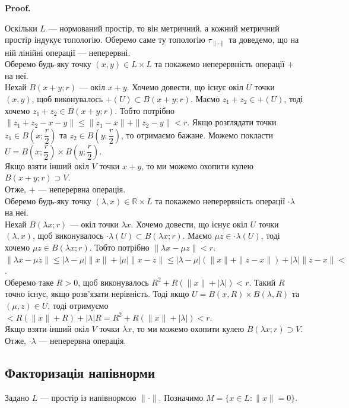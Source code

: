 \documentclass[a4paper, 10pt]{article}
\makeatletter
\theoremstyle{theoremdd}
\theoremstyle{theoremdd}
\theoremstyle{theoremdd}
\theoremstyle{theoremdd}
\theoremstyle{theoremdd}
\theoremstyle{theoremdd}
\theoremstyle{theoremdd}
\theoremstyle{theoremdd}
\renewenvironment{proof}[1][Proof.\\]{\par
\pushQED{\hfill \qed}%
\normalfont \topsep6\p@\@plus6\p@\relax
\trivlist
\item\relax
{\bfseries
#1\@addpunct{.}}\hspace\labelsep\ignorespaces
}{%
\popQED\endtrivlist\@endpefalse
}
\makeatother
\begin{document}
\begin{proof}
Оскільки $L$ --- нормований простір, то він метричний, а кожний метричний простір індукує топологію. Оберемо саме ту топологію $\tau_{\| \cdot \|}$ та доведемо, що на ній лінійні операції --- неперервні.\\
Оберемо будь-яку точку $(x,y) \in L \times L$ та покажемо неперервність операції $+$ на неї.\\
Нехай $B(x+y;r)$ --- окіл $x+y$. Хочемо довести, що існує окіл $U$ точки $(x,y)$, щоб виконувалось $+(U) \subset B(x+y;r)$. Маємо $z_1+z_2 \in +(U)$, тоді хочемо $z_1+z_2 \in B(x+y;r)$. Тобто потрібно $\|z_1 + z_2 - x - y\| \leq \|z_1 - x\| + \|z_2 - y\| < r$. Якщо розглядати точки $z_1 \in B\left(x; \dfrac{r}{2}\right)$ та $z_2 \in B\left(y; \dfrac{r}{2}\right)$, то отримаємо бажане. Можемо покласти $U = B\left(x; \dfrac{r}{2}\right) \times B\left(y; \dfrac{r}{2}\right)$.\\
Якщо взяти інший окіл $V$ точки $x+y$, то ми можемо охопити кулею $B(x+y;r) \supset V$.\\
Отже, $+$ --- неперервна операція.
\bigskip \\
Оберемо будь-яку точку $(\lambda,x) \in \mathbb{R} \times L$ та покажемо неперервність операції $\cdot \lambda$ на неї.\\
Нехай $B(\lambda x;r)$ --- окіл точки $\lambda x$. Хочемо довести, що існує окіл $U$ точки $(\lambda,x)$, щоб виконувалось $\cdot \lambda(U) \subset B(\lambda x;r)$. Маємо $\mu z \in \cdot \lambda(U)$, тоді хочемо $\mu z \in B(\lambda x;r)$. Тобто потрібно $\| \lambda x - \mu z\| < r$.\\
$\| \lambda x - \mu z \| \leq |\lambda - \mu| \|x\| + |\mu| \|x-z\| \leq |\lambda - \mu| (\|x\| + \|z-x\|) + |\lambda| \| z - x \| \boxed{<}$.\\
Оберемо таке $R > 0$, щоб виконувалось $R^2 + R(\|x\| + |\lambda|) < r$. Такий $R$ точно існує, якщо розв'язати нерівність. Тоді якщо $U = B(x,R) \times B(\lambda,R)$ та $(\mu,z) \in U$, тоді отримуємо\\
$\boxed{<} R(\|x\| + R) + |\lambda| R = R^2 + R(\|x\| + |\lambda|) < r $.\\
Якщо взяти інший окіл $V$ точки $\lambda x$, то ми можемо охопити кулею $B(\lambda x; r) \supset V$.\\
Отже, $\cdot \lambda$ --- неперервна операція. 
\end{proof}

\subsection{Факторизація напівнорми}
Задано $L$ --- простір із напівнормою $\| \cdot \|$. Позначимо $M = \{x \in L: \|x\| = 0\}$.
\end{document}
